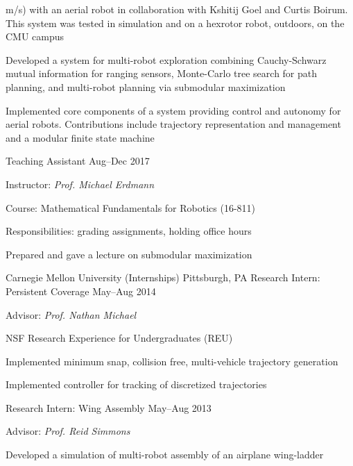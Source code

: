 \begin{cventries}
{\begin{cvitems}
      m/s) with an aerial robot in collaboration with Kshitij Goel and Curtis
      Boirum.
      This system was tested in simulation and on a hexrotor robot, outdoors, on
      the CMU campus
    \item Developed a system for multi-robot exploration combining Cauchy-Schwarz
      mutual information for ranging sensors, Monte-Carlo tree search for path
      planning, and multi-robot planning via submodular maximization
    \item Implemented core components of a system providing control and autonomy
      for aerial robots.
      Contributions include trajectory representation and management and a
      modular finite state machine
    \end{cvitems}
  }
  {Teaching Assistant}
  {Aug--Dec 2017}
  {
    Instructor: \emph{Prof. Michael Erdmann}\linebreak
    \begin{cvitems} %
    \item Course: Mathematical Fundamentals for Robotics (16-811)
    \item Responsibilities: grading assignments, holding office hours
    \item Prepared and gave a lecture on submodular maximization
    \end{cvitems}
  }
  \cventrytwo
  {Carnegie Mellon University (Internships)}
  {Pittsburgh, PA}
  {Research Intern: Persistent Coverage}
  {May--Aug 2014}
  {
    Advisor: \emph{Prof. Nathan Michael}\linebreak
    \begin{cvitems}
    \item NSF Research Experience for Undergraduates (REU)
    \item Implemented minimum snap, collision free, multi-vehicle trajectory
      generation
    \item Implemented controller for tracking of discretized trajectories
    \end{cvitems}
  }
  {Research Intern: Wing Assembly}
  {May--Aug 2013}
  {
    Advisor: \emph{Prof. Reid Simmons}\linebreak
    \begin{cvitems}
    \item Developed a simulation of multi-robot assembly of an airplane wing-ladder

\end{cvitems}}
\end{cventries}

